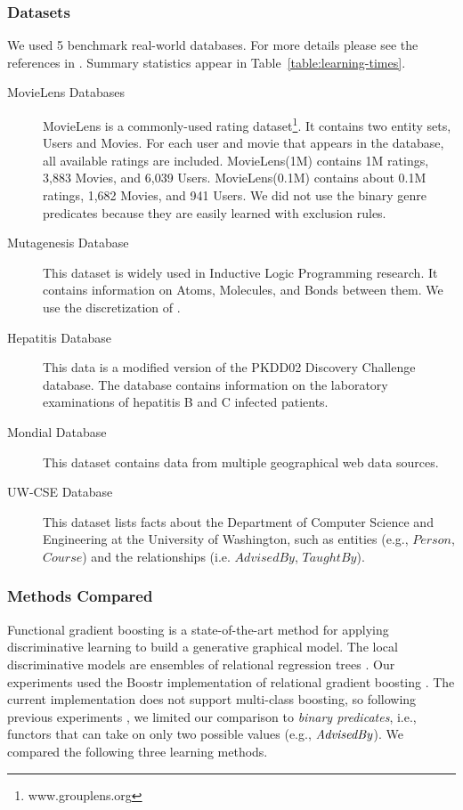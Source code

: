 \documentclass[runningheads,a4paper]{llncs}
\begin{document}
\subsubsection{Datasets}
We used 5 benchmark real-world databases. For more details please see the references in \cite{Schulte2012}. Summary statistics appear in Table~\ref{table:learning-times}.

\begin{description}

\item[MovieLens Databases] MovieLens is a  commonly-used rating dataset\footnote {www.grouplens.org}. %
It contains two entity sets, Users and Movies. For each user and movie that appears in the database, all available ratings are included. MovieLens(1M) contains 1M ratings, 3,883 Movies, and 6,039 Users. MovieLens(0.1M) contains about 0.1M ratings, 1,682 Movies, and 941 Users. We did not use the binary genre predicates because they are easily learned with exclusion rules.


\item[Mutagenesis Database] This dataset is widely used in Inductive Logic Programming research. 
It contains information on Atoms, Molecules, and Bonds between them. We use the discretization of \cite{Schulte2012}.

\item[Hepatitis Database] This data is a modified version of the PKDD02 Discovery Challenge database. %
The database contains information on the laboratory examinations of hepatitis B and C infected patients. 

\item[Mondial Database] 
This dataset contains data from multiple geographical web data sources. 

\item[UW-CSE Database] This dataset lists facts about the Department of Computer Science and Engineering at the University of Washington, such as entities (e.g., $Person$, $Course$) and the relationships (i.e. $AdvisedBy$, $TaughtBy$).
\end{description}

\subsubsection{Methods Compared} Functional gradient boosting is a state-of-the-art method for applying discriminative learning to build a generative graphical model. The local discriminative models are  ensembles of relational regression trees \cite{Khot2011}. Our experiments used the Boostr implementation of relational gradient boosting \cite{Khot2013}. The current implementation does not support multi-class boosting, so following previous experiments \cite{Khot2011}, we limited our comparison to {\em binary predicates}, i.e., functors that can take on only two possible values (e.g., $\it{AdvisedBy}$). We compared the following three learning methods.
\end{document}
